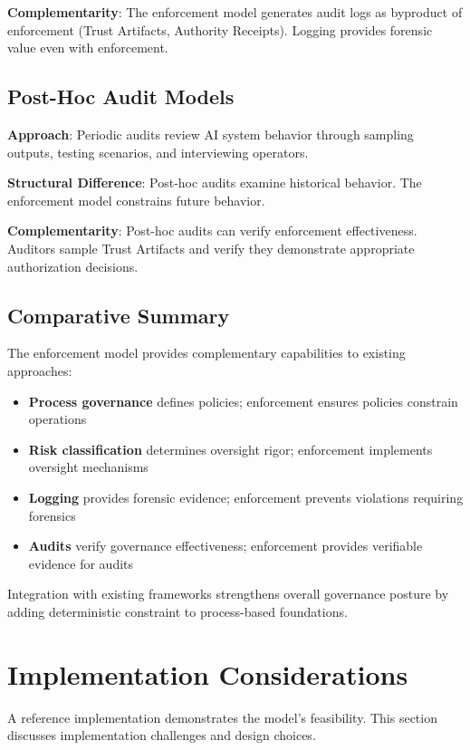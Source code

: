 \documentclass[11pt,letterpaper]{article}
\begin{document}
\textbf{Complementarity}: The enforcement model generates audit logs as byproduct of enforcement (Trust Artifacts, Authority Receipts). Logging provides forensic value even with enforcement.

\subsection{Post-Hoc Audit Models}

\textbf{Approach}: Periodic audits review AI system behavior through sampling outputs, testing scenarios, and interviewing operators.

\textbf{Structural Difference}: Post-hoc audits examine historical behavior. The enforcement model constrains future behavior.

\textbf{Complementarity}: Post-hoc audits can verify enforcement effectiveness. Auditors sample Trust Artifacts and verify they demonstrate appropriate authorization decisions.

\subsection{Comparative Summary}

The enforcement model provides complementary capabilities to existing approaches:

\begin{itemize}
\item \textbf{Process governance} defines policies; enforcement ensures policies constrain operations
\item \textbf{Risk classification} determines oversight rigor; enforcement implements oversight mechanisms
\item \textbf{Logging} provides forensic evidence; enforcement prevents violations requiring forensics
\item \textbf{Audits} verify governance effectiveness; enforcement provides verifiable evidence for audits
\end{itemize}

Integration with existing frameworks strengthens overall governance posture by adding deterministic constraint to process-based foundations.

\section{Implementation Considerations}
\label{sec:implementation}

A reference implementation demonstrates the model's feasibility. This section discusses implementation challenges and design choices.
\end{document}
